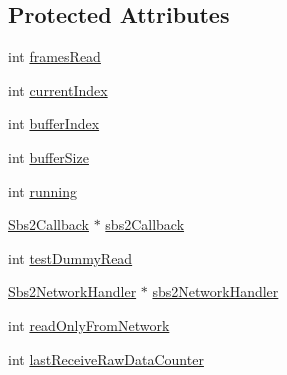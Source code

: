 \subsection*{Protected Attributes}
\begin{DoxyCompactItemize}
\item 
int \hyperlink{classSbs2DataReader_a09c24a1835b3289cc5f7cb5fe975823d}{frames\-Read}
\item 
int \hyperlink{classSbs2DataReader_a65ac7461c3253ec38d8837eac759cf8d}{current\-Index}
\item 
int \hyperlink{classSbs2DataReader_ac7d4147f409871c52e0a49f451f4aedf}{buffer\-Index}
\item 
int \hyperlink{classSbs2DataReader_a40cf787abf8171fcc26384d31e0fa440}{buffer\-Size}
\item 
int \hyperlink{classSbs2DataReader_abf87e9f54439bacc5e9181a7c61394b8}{running}
\item 
\hyperlink{classSbs2Callback}{Sbs2\-Callback} $\ast$ \hyperlink{classSbs2DataReader_a3e6b283fc7ad156341ca90c64139f88a}{sbs2\-Callback}
\item 
int \hyperlink{classSbs2DataReader_a7c66f0a2da31e3c186bfb3ac7da13ecb}{test\-Dummy\-Read}
\item 
\hyperlink{classSbs2NetworkHandler}{Sbs2\-Network\-Handler} $\ast$ \hyperlink{classSbs2DataReader_afb837cc5dbf1d189a64f47e76878bf4c}{sbs2\-Network\-Handler}
\item 
int \hyperlink{classSbs2DataReader_aaef5f0c54d01dec8075721c8367e68c2}{read\-Only\-From\-Network}
\item 
int \hyperlink{classSbs2DataReader_a187026725f6512dda1a579b5876cea83}{last\-Receive\-Raw\-Data\-Counter}
\end{DoxyCompactItemize}


